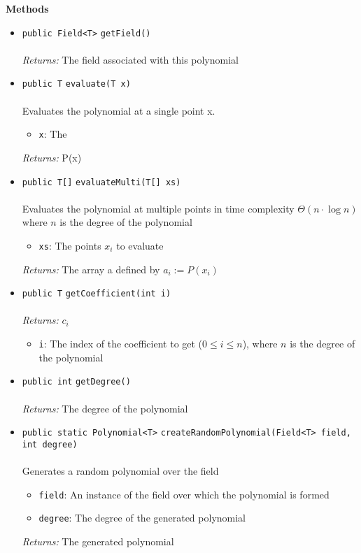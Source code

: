 \textbf{\sffamily Methods}
\begin{itemize}
\item \lstinline|public Field<T>| \lstinline|getField|\lstinline|()|\\ \\[-0.6em]
\emph{Returns:} The field associated with this polynomial



\item \lstinline|public T| \lstinline|evaluate|\lstinline|(T x)|\\ \\[-0.6em]
Evaluates the polynomial at a single point x.
\begin{itemize}
\item \lstinline|x|: The
\end{itemize}

\emph{Returns:} P(x)

\item \lstinline|public T[]| \lstinline|evaluateMulti|\lstinline|(T[] xs)|\\ \\[-0.6em]
Evaluates the polynomial at multiple points in time complexity $\Theta(n\cdot\log
 n)$ where $n$ is the degree of the polynomial
\begin{itemize}
\item \lstinline|xs|: The points $x_i$ to evaluate
\end{itemize}

\emph{Returns:} The array a defined by $a_i := P(x_i)$

\item \lstinline|public T| \lstinline|getCoefficient|\lstinline|(int i)|\\ \\[-0.6em]
\emph{Returns:} $c_i$
\begin{itemize}
\item \lstinline|i|: The index of the coefficient to get ($0 \leq i \leq n$), where
          $n$ is the degree of the polynomial
\end{itemize}



\item \lstinline|public int| \lstinline|getDegree|\lstinline|()|\\ \\[-0.6em]
\emph{Returns:} The degree of the polynomial



\item \lstinline|public static Polynomial<T>| \lstinline|createRandomPolynomial|\lstinline|(Field<T> field, int degree)|\\ \\[-0.6em]
Generates a random polynomial over the field
\begin{itemize}
\item \lstinline|field|: An instance of the field over which the polynomial is formed
\item \lstinline|degree|: The degree of the generated polynomial
\end{itemize}

\emph{Returns:} The generated polynomial

\end{itemize}

